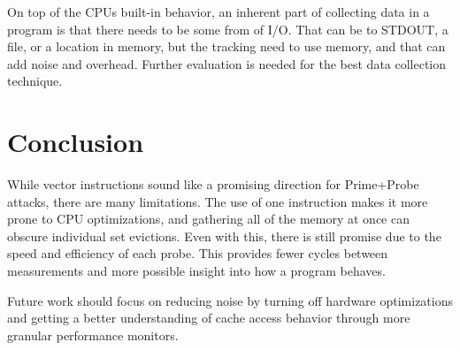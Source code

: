 \documentclass[article]{IEEEtran}
\begin{document}
On top of the CPUs built-in behavior, an inherent part of collecting data in a program is that there needs to be some from of I/O. That can be to STDOUT, a file, or a location in memory, but the tracking need to use memory, and that can add noise and overhead. Further evaluation is needed for the best data collection technique.

\section{Conclusion}
While vector instructions sound like a promising direction for Prime+Probe attacks, there are many limitations. The use of one instruction makes it more prone to CPU optimizations, and gathering all of the memory at once can obscure individual set evictions. Even with this, there is still promise due to the speed and efficiency of each probe. This provides fewer cycles between measurements and more possible insight into how a program behaves.

Future work should focus on reducing noise by turning off hardware optimizations and getting a better understanding of cache access behavior through more granular performance monitors.



\end{document}
